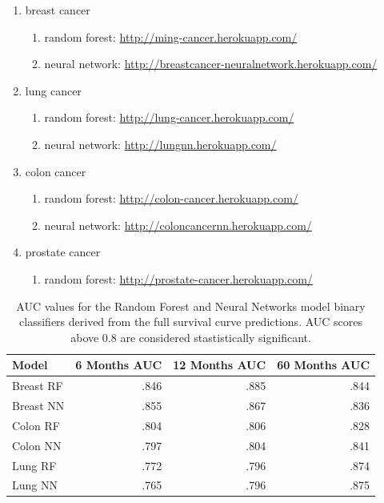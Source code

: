 \documentclass[a4paper,11pt]{article}
\begin{document}
\begin{enumerate}[noitemsep]
\item breast cancer 
    \begin{enumerate}[noitemsep]
    \item random forest: \url{http://ming-cancer.herokuapp.com/}
    \item neural network: \url{http://breastcancer-neuralnetwork.herokuapp.com/}
    \end{enumerate}
\item lung cancer
   \begin{enumerate}[noitemsep]
   \item random forest: \url{http://lung-cancer.herokuapp.com/}
   \item neural network: \url{http://lungnn.herokuapp.com/}
    \end{enumerate}
\item colon cancer
  \begin{enumerate}[noitemsep]
   \item random forest: \url{http://colon-cancer.herokuapp.com/}
   \item neural network: \url{http://coloncancernn.herokuapp.com/}
   \end{enumerate}
\item prostate cancer
  \begin{enumerate}[noitemsep]
   \item random forest: \url{http://prostate-cancer.herokuapp.com/}
   \end{enumerate}
\end{enumerate}




\begin{table}[H]
\begin{center}
\begin{tabular}{lrrr}
\toprule
Model & 6 Months AUC & 12 Months AUC & 60 Months AUC \\ 
\midrule
Breast RF &  .846       &     .885           &  .844 \\ 
Breast NN &   .855      &     .867      &    .836 \\ 
Colon RF  &     .804          &      .806           &      .828           \\ 
Colon NN   &     .797          &          .804         &   .841  \\ 
Lung RF    &      .772               &        .796               &   .874  \\ 
Lung NN    &        .765              &        .796               &  .875  \\
\bottomrule
\end{tabular}
\caption{\label{tab:AUC} AUC values for the Random Forest and Neural Networks model
binary classifiers derived from the full survival curve predictions. AUC scores above 0.8 are considered stastistically significant.}
\end{center}
\end{table}
\end{document}
